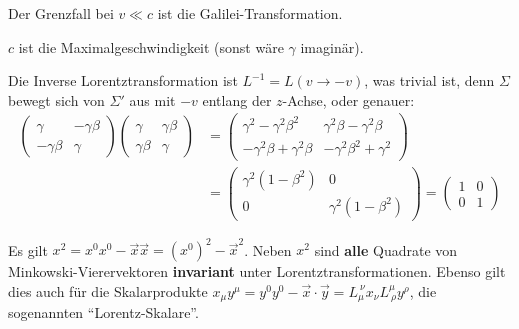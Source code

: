 \begin{bemerkung*}
	Der Grenzfall bei $v \ll c$ ist die Galilei-Transformation.
\end{bemerkung*}
\begin{bemerkung*}
	 $c$ ist die Maximalgeschwindigkeit (sonst wäre $\gamma$ imaginär).
\end{bemerkung*}
\begin{bemerkung*}
	Die Inverse Lorentztransformation ist $L^{-1} = L(v \to -v)$, was trivial ist, denn $\Sigma$ bewegt sich von $\Sigma'$ aus mit $-v$ entlang der $z$-Achse, oder genauer:
	\begin{align*}
	\begin{pmatrix}
	\gamma & -\gamma \beta\\
	-\gamma \beta & \gamma
	\end{pmatrix}
	\begin{pmatrix}
	\gamma & \gamma \beta\\
	\gamma \beta & \gamma
	\end{pmatrix}
	&= 	\begin{pmatrix}
	\gamma^2 - \gamma^2 \beta^2& \gamma^2 \beta -\gamma^2 \beta\\
	-\gamma^2 \beta + \gamma^2 \beta & -\gamma^2 \beta^2 + \gamma^2
	\end{pmatrix}\\
	&= \begin{pmatrix}
	\gamma^2(1 - \beta^2)& 0\\
	0 & \gamma^2(1 - \beta^2)
	\end{pmatrix}
	= \begin{pmatrix}
	1 & 0 \\ 0 & 1
	\end{pmatrix}
	\end{align*}
\end{bemerkung*}
\begin{bemerkung*} Es gilt $x^2 = x^0 x^0 - \vec{x} \vec{x} = (x^0)^2 - \vec{x}^2$. Neben $x^2$ sind \textbf{alle} Quadrate von Minkowski-Vierervektoren \textbf{invariant} unter Lorentztransformationen. Ebenso gilt dies auch für die Skalarprodukte $x_\mu y^\mu = y^0 y^0 - \vec{x}\cdot\vec{y} = L_{\mu}^{~\nu} x_\nu  L^{\mu}_{~\rho}y^\rho$, die sogenannten "`Lorentz-Skalare"'.
\end{bemerkung*}

